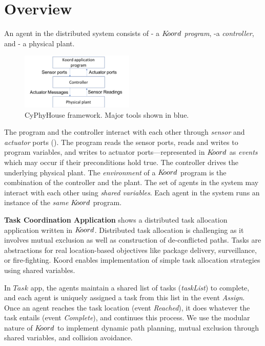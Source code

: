 \section{Overview}
\label{sec:overview}
     An agent in the distributed system consists of -
a $K\kern-2pt oord$ {\em program}, 
-a {\em controller}, and 
- a physical plant.

\begin{figure}[h!]
\centering
\includegraphics[width=0.48\textwidth]{figs/krdarch.png}
\caption{\small CyPhyHouse framework. Major tools shown in blue.}
\label{fig:arch}
\end{figure}
The program and the controller interact with each other through {\em sensor} and {\em actuator} ports ().  The program reads the sensor ports, reads and writes to program variables, and writes to actuator ports---represented in $K\kern-2pt oord$ as \emph{events} which may occur if their preconditions hold true. The controller drives the underlying physical plant. The \emph{environment} of a  $K\kern-2pt oord$ program is the combination of the controller and the plant. The set of agents in the system may interact with each other using {\em shared variables\/}. Each agent in the system runs an instance of the \emph{same} $K\kern-2pt oord$ program. 
    
{\bf Task Coordination Application}  shows a distributed task allocation application written in $K\kern-2pt oord$. Distributed task allocation is challenging as it involves mutual exclusion as well as construction of de-conflicted  paths. Tasks are abstractions for real location-based objectives like package delivery, surveillance, or fire-fighting.  Koord enables implementation of simple task allocation strategies using shared variables.

In $\mathit{Task}$ app, the agents maintain a shared list of tasks ({\em taskList}) to complete, and each agent is uniquely assigned a task from this list in the event {\em Assign}. Once an agent reaches the task location (event {\em Reached}), it does whatever the task entails (event {\em Complete}), and continues this process. We use the modular nature of $K\kern-2pt oord$ to implement dynamic path planning,  mutual exclusion through shared variables, and  collision avoidance.


